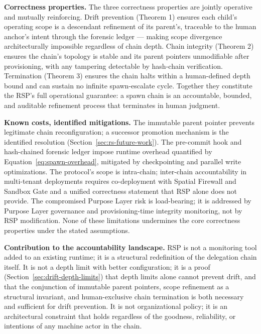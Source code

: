 \medskip
\noindent\textbf{Correctness properties.} The three correctness properties are jointly operative and mutually reinforcing. Drift prevention (Theorem 1) ensures each child's operating scope is a descendant refinement of its parent's, traceable to the human anchor's intent through the forensic ledger — making scope divergence architecturally impossible regardless of chain depth. Chain integrity (Theorem 2) ensures the chain's topology is stable and its parent pointers unmodifiable after provisioning, with any tampering detectable by hash-chain verification. Termination (Theorem 3) ensures the chain halts within a human-defined depth bound and can sustain no infinite spawn-escalate cycle. Together they constitute the RSP's full operational guarantee: a spawn chain is an accountable, bounded, and auditable refinement process that terminates in human judgment.

\medskip
\noindent\textbf{Known costs, identified mitigations.} The immutable parent pointer prevents legitimate chain reconfiguration; a successor promotion mechanism is the identified resolution (Section~\ref{sec:rs-future-work}). The pre-commit hook and hash-chained forensic ledger impose runtime overhead quantified by Equation~\ref{eq:spawn-overhead}, mitigated by checkpointing and parallel write optimizations. The protocol's scope is intra-chain; inter-chain accountability in multi-tenant deployments requires co-deployment with Spatial Firewall and Sandbox Gate and a unified correctness statement that RSP alone does not provide. The compromised Purpose Layer risk is load-bearing; it is addressed by Purpose Layer governance and provisioning-time integrity monitoring, not by RSP modification. None of these limitations undermines the core correctness properties under the stated assumptions.

\medskip
\noindent\textbf{Contribution to the accountability landscape.} RSP is not a monitoring tool added to an existing runtime; it is a structural redefinition of the delegation chain itself. It is not a depth limit with better configuration; it is a proof (Section~\ref{sec:drift-depth-limits}) that depth limits alone cannot prevent drift, and that the conjunction of immutable parent pointers, scope refinement as a structural invariant, and human-exclusive chain termination is both necessary and sufficient for drift prevention. It is not organizational policy; it is an architectural constraint that holds regardless of the goodness, reliability, or intentions of any machine actor in the chain.

